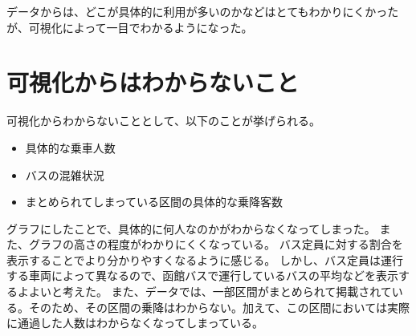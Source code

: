 \documentclass[a4paper,twocolumn,11pt]{ltjsarticle}
\begin{document}
データからは、どこが具体的に利用が多いのかなどはとてもわかりにくかったが、可視化によって一目でわかるようになった。

\section{可視化からはわからないこと}

可視化からわからないこととして、以下のことが挙げられる。

\begin{itemize}
    \item 具体的な乗車人数
    \item バスの混雑状況
    \item まとめられてしまっている区間の具体的な乗降客数
\end{itemize}

グラフにしたことで、具体的に何人なのかがわからなくなってしまった。
また、グラフの高さの程度がわかりにくくなっている。
バス定員に対する割合を表示することでより分かりやすくなるように感じる。
しかし、バス定員は運行する車両によって異なるので、函館バスで運行しているバスの平均などを表示するよよいと考えた。
また、データでは、一部区間がまとめられて掲載されている。そのため、その区間の乗降はわからない。加えて、この区間においては実際に通過した人数はわからなくなってしまっている。
\end{document}
